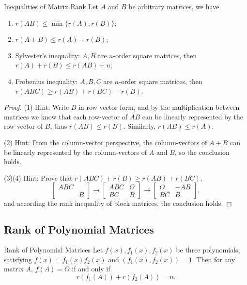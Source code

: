 \begin{theorem}{Inequalities of Matrix Rank}{}
  Let $A$ and $B$ be arbitrary matrices, we have
  \begin{enumerate}
  \item $r(AB) \leq \min\{r(A), r(B)\}$;
  \item $r(A + B) \leq r(A) + r(B)$;
  \item Sylvester's inequality: $A, B$ are $n$-order square matrices, then $r(A)
    + r(B) \leq r(AB) + n$;
  \item Frobenius inequality: $A, B, C$ are $n$-order square matrices,
    then $r(ABC) \geq r(AB) + r(BC) - r(B)$.
  \end{enumerate}
\end{theorem}

\begin{proof}
  (1) Hint: Write $B$ in row-vector form, and by the multiplication between
  matrices we know that each row-vector of $AB$ can be linearly represented by
  the row-vector of $B$, thus $r(AB) \leq r(B)$.
  Similarly, $r(AB) \leq r(A)$.

  (2) Hint: From the column-vector perspective,
  the column-vectors of $A + B$ can be linearly represented by
  the column-vectors of $A$ and $B$, so the conclusion holds.

  (3)(4) Hint: Prove that $r(ABC) + r(B) \geq r(AB) + r(BC)$,
  \begin{equation}
    \begin{bmatrix}ABC&\\&B\end{bmatrix}\to\begin{bmatrix}ABC&O\\BC&B\end{bmatrix}\to\begin{bmatrix}O&-AB\\BC&B\end{bmatrix},
  \end{equation}
  and according the rank inequality of block matrices, the conclusion holds.
\end{proof}

\subsection{Rank of Polynomial Matrices}

\begin{theorem}{Rank of Polynomial Matrices}{}
  Let $f(x), f_1(x), f_2(x)$ be three polynomials, satisfying
    $f(x) = f_1(x) f_2(x)$ and $(f_1(x), f_2(x)) = 1$.
    Then for any matrix $A$, $f(A) = O$ if and only if
    \begin{equation}
    r(f_1(A)) + r(f_2(A)) = n.
    \end{equation}
\end{theorem}


